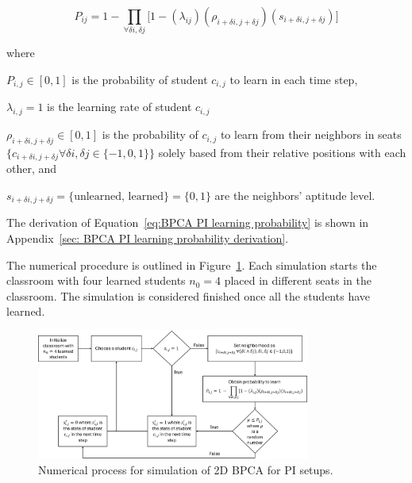 \begin{equation}
    \label{eq:BPCA PI learning probability}
        P_{ij} = 1 - \prod_{\forall \delta i, \delta j}{\lbrack1-(\lambda_{ij})(\rho_{i+\delta i, j+\delta j})(s_{i+\delta i, j+\delta j})}\rbrack
\end{equation}

where

$P_{i,j} \in [0,1]$ is the probability of student $c_{i,j}$ to learn in each time step, 

$\lambda_{i,j} = 1$ is the learning rate of student $c_{i,j}$

$\rho_{i+\delta i, j+\delta j} \in [0,1]$ is the probability of $c_{i,j}$ to learn from their neighbors in seats $\lbrace c_{i+\delta i, j+\delta j} \forall \delta i, \delta j \in \lbrace -1,0,1 \rbrace \rbrace$ solely based from their relative positions with each other, and

$s_{i+\delta i, j+\delta j} = \lbrace\text{unlearned, learned}\rbrace=\lbrace 0,1 \rbrace$ are the neighbors' aptitude level.

The derivation of Equation~\ref{eq:BPCA PI learning probability} is shown in Appendix~\ref{sec: BPCA PI learning probability derivation}.

The numerical procedure is outlined in Figure~\ref{fig:2DBPCA PI Flowchart}. 
Each simulation starts the classroom with four learned students $n_0 = 4$ placed in different seats in the classroom. 
The simulation is considered finished once all the students have learned.

\begin{figure}[htbp!]
    \centering
    \includegraphics[width=0.8\textwidth]{figures/2DBPCA PI Flowchart.png}
    \caption[Peer instruction simulation flowchart]{Numerical process for simulation of 2D BPCA for PI setups.}
    \label{fig:2DBPCA PI Flowchart}
\end{figure}

